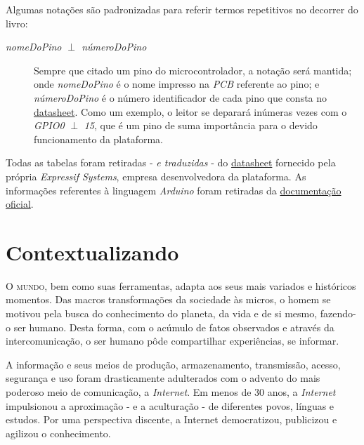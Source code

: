 \documentclass[
	11pt,				%
	openright,			%
	twoside,			%
	a5paper,			%
	english,			%
	french,				%
	spanish,			%
	brazil,				%
	sumario=tradicional
]{abntex2}
\begin{document}
Algumas notações são padronizadas para referir termos repetitivos no decorrer do livro:

\begin{description}
\item [\emph{nomeDoPino $\perp$ númeroDoPino}] Sempre que citado um pino do microcontrolador, a notação será mantida;  onde \textit{nomeDoPino} é o nome impresso na \textit{PCB} referente ao pino; e \textit{númeroDoPino} é o número identificador de cada pino que consta no \href{http://espressif.com/sites/default/files/documentation/0a-esp8266ex_datasheet_en.pdf}{datasheet}. Como um exemplo, o leitor se deparará inúmeras vezes com o \emph{GPIO0} $\perp$ \emph{15}, que é um pino de suma importância para o devido funcionamento da plataforma.
\end{description}

Todas as tabelas  foram retiradas - \textit{e traduzidas} - do \href{http://espressif.com/sites/default/files/documentation/0a-esp8266ex_datasheet_en.pdf}{datasheet} fornecido pela própria \textit{Expressif Systems}, empresa desenvolvedora da plataforma. As informações referentes à linguagem \textit{Arduino} foram retiradas da \href{https://arduino.cc/reference/en/}{documentação oficial}.

\chapter{Contextualizando}
  
  \lettrine[nindent=0.35em,lhang=0.40,loversize=0.3]{O}{ mundo}, bem como suas ferramentas, adapta aos seus mais variados e históricos momentos. Das macros transformações da sociedade às micros, o homem se motivou pela busca do conhecimento do planeta, da vida e de si mesmo, fazendo-o ser humano. Desta forma, com o acúmulo de fatos observados e através da intercomunicação, o ser humano pôde compartilhar experiências, se informar.
  
  A informação e seus meios de produção, armazenamento, transmissão, acesso, segurança e  uso foram drasticamente adulterados com o advento do mais poderoso meio de comunicação, a \textit{Internet}. Em menos de 30 anos, a \textit{Internet} impulsionou a aproximação - e a aculturação - de diferentes povos, línguas e estudos. Por uma perspectiva discente, a Internet democratizou, publicizou e agilizou o conhecimento. 

\newpage
\end{document}
